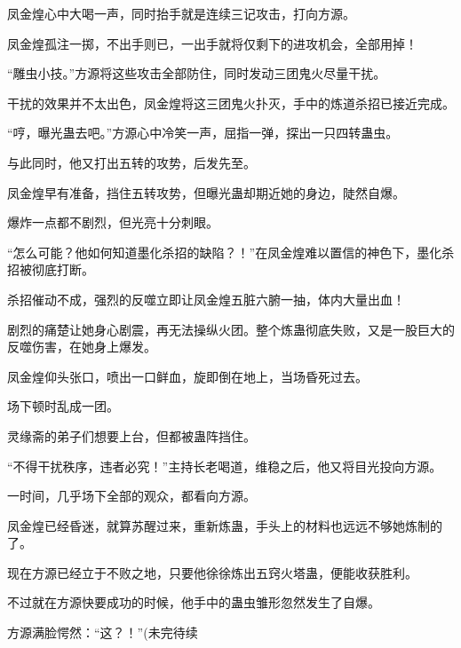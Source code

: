 \begin{this_body}
凤金煌心中大喝一声，同时抬手就是连续三记攻击，打向方源。

凤金煌孤注一掷，不出手则已，一出手就将仅剩下的进攻机会，全部用掉！

“雕虫小技。”方源将这些攻击全部防住，同时发动三团鬼火尽量干扰。

干扰的效果并不太出色，凤金煌将这三团鬼火扑灭，手中的炼道杀招已接近完成。

“哼，曝光蛊去吧。”方源心中冷笑一声，屈指一弹，探出一只四转蛊虫。

与此同时，他又打出五转的攻势，后发先至。

凤金煌早有准备，挡住五转攻势，但曝光蛊却期近她的身边，陡然自爆。

爆炸一点都不剧烈，但光亮十分刺眼。

“怎么可能？他如何知道墨化杀招的缺陷？！”在凤金煌难以置信的神色下，墨化杀招被彻底打断。

杀招催动不成，强烈的反噬立即让凤金煌五脏六腑一抽，体内大量出血！

剧烈的痛楚让她身心剧震，再无法操纵火团。整个炼蛊彻底失败，又是一股巨大的反噬伤害，在她身上爆发。

凤金煌仰头张口，喷出一口鲜血，旋即倒在地上，当场昏死过去。

场下顿时乱成一团。

灵缘斋的弟子们想要上台，但都被蛊阵挡住。

“不得干扰秩序，违者必究！”主持长老喝道，维稳之后，他又将目光投向方源。

一时间，几乎场下全部的观众，都看向方源。

凤金煌已经昏迷，就算苏醒过来，重新炼蛊，手头上的材料也远远不够她炼制的了。

现在方源已经立于不败之地，只要他徐徐炼出五窍火塔蛊，便能收获胜利。

不过就在方源快要成功的时候，他手中的蛊虫雏形忽然发生了自爆。

方源满脸愕然：“这？！”(未完待续

\end{this_body}

